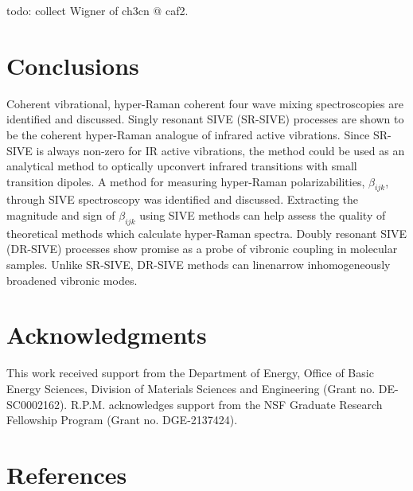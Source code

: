 \documentclass[aip, jcp, reprint, onecolumn]{revtex4-2}
\begin{document}
todo: collect Wigner of ch3cn @ caf2. 


\section{Conclusions}%
Coherent vibrational, hyper-Raman coherent four wave mixing spectroscopies are identified and discussed.
Singly resonant SIVE (SR-SIVE) processes are shown to be the coherent hyper-Raman analogue of infrared active vibrations.
Since SR-SIVE is always non-zero for IR active vibrations, the method could be used as an analytical method to optically upconvert infrared transitions with small transition dipoles.
A method for measuring hyper-Raman polarizabilities, $\beta_{ijk}$, through SIVE spectroscopy was identified and discussed.
Extracting the magnitude and sign of $\beta_{ijk}$ using SIVE methods can help assess the quality of theoretical methods which calculate hyper-Raman spectra. 
Doubly resonant SIVE (DR-SIVE) processes show promise as a probe of vibronic coupling in molecular samples.
Unlike SR-SIVE, DR-SIVE methods can linenarrow inhomogeneously broadened vibronic modes. 

\section{Acknowledgments}
This work received support from the Department of Energy, Office of Basic Energy Sciences, Division of Materials Sciences and Engineering (Grant no. DE-SC0002162).
R.P.M. acknowledges support from the NSF Graduate Research Fellowship Program (Grant no. DGE-2137424). 


\section{References}

\end{document}
